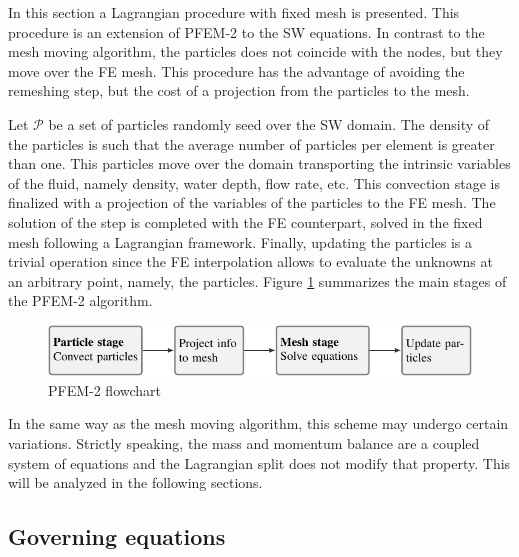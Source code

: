 In this section a Lagrangian procedure with fixed mesh is presented. This procedure is an extension of PFEM-2 \cite{idelsohn2012} to the SW equations. In contrast to the mesh moving algorithm, the particles does not coincide with the nodes, but they move over the FE mesh. This procedure has the advantage of avoiding the remeshing step, but the cost of a projection from the particles to the mesh.

Let $\mathcal{P}$ be a set of particles randomly seed over the SW domain. The density of the particles is such that the average number of particles per element is greater than one. This particles move over the domain transporting the intrinsic variables of the fluid, namely density, water depth, flow rate, etc. This convection stage is finalized with a projection of the variables of the particles to the FE mesh.
The solution of the step is completed with the FE counterpart, solved in the fixed mesh following a Lagrangian framework. Finally, updating the particles is a trivial operation since the FE interpolation allows to evaluate the unknowns at an arbitrary point, namely, the particles.
Figure \ref{pfem2_stage_flowchart} summarizes the main stages of the PFEM-2 algorithm.


\begin{figure}
    \centering
    \includegraphics[width=\textwidth]{img/lagrangian/pfem2_stage_flowchart.pdf}
    \caption{PFEM-2 flowchart}
    \label{pfem2_stage_flowchart}
\end{figure}


In the same way as the mesh moving algorithm, this scheme may undergo certain variations. Strictly speaking, the mass and momentum balance are a coupled system of equations and the Lagrangian split does not modify that property. This will be analyzed in the following sections.



\subsection{Governing equations}


